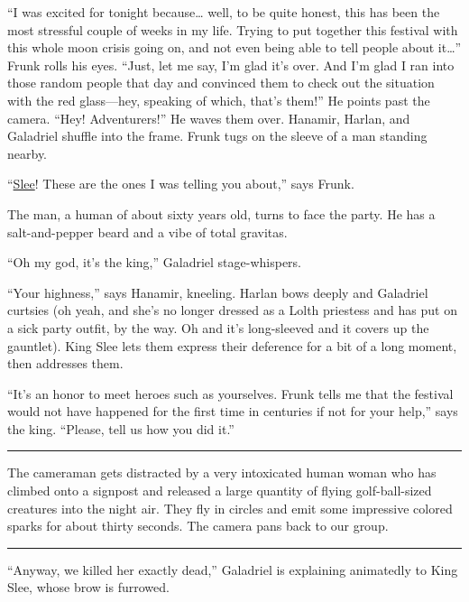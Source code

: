 \documentclass[smalldemyvopaper,11pt,twoside,onecolumn,openright,extrafontsizes]{memoir}
\begin{document}
``I was excited for tonight because\ldots{} well, to be quite honest,
this has been the most stressful couple of weeks in my life. Trying to
put together this festival with this whole moon crisis going on, and not
even being able to tell people about it\ldots{}'' Frunk rolls his eyes.
``Just, let me say, I'm glad it's over. And I'm glad I ran into those
random people that day and convinced them to check out the situation
with the red glass---hey, speaking of which, that's them!'' He points
past the camera. ``Hey! Adventurers!'' He waves them over. Hanamir,
Harlan, and Galadriel shuffle into the frame. Frunk tugs on the sleeve
of a man standing nearby.

``\href{/characters/slee/}{Slee}! These are the ones I was telling you
about,'' says Frunk.

The man, a human of about sixty years old, turns to face the party. He
has a salt-and-pepper beard and a vibe of total gravitas.

``Oh my god, it's the king,'' Galadriel stage-whispers.

``Your highness,'' says Hanamir, kneeling. Harlan bows deeply and
Galadriel curtsies (oh yeah, and she's no longer dressed as a Lolth
priestess and has put on a sick party outfit, by the way. Oh and it's
long-sleeved and it covers up the gauntlet). King Slee lets them express
their deference for a bit of a long moment, then addresses them.

``It's an honor to meet heroes such as yourselves. Frunk tells me that
the festival would not have happened for the first time in centuries if
not for your help,'' says the king. ``Please, tell us how you did it.''

\begin{center}\rule{0.5\linewidth}{\linethickness}\end{center}

The cameraman gets distracted by a very intoxicated human woman who has
climbed onto a signpost and released a large quantity of flying
golf-ball-sized creatures into the night air. They fly in circles and
emit some impressive colored sparks for about thirty seconds. The camera
pans back to our group.

\begin{center}\rule{0.5\linewidth}{\linethickness}\end{center}

``Anyway, we killed her exactly dead,'' Galadriel is explaining
animatedly to King Slee, whose brow is furrowed.
\end{document}
